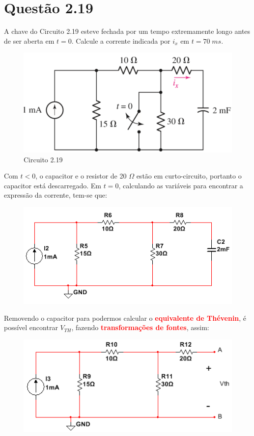 \documentclass[
	12pt,				%
	oneside,			%
	a4paper,			%
	english,			%
	french,				%
	spanish,			%
	brazil				%
	]{abntex2}
\begin{document}
\section*{Questão 2.19}
A chave do Circuito 2.19 esteve fechada por um tempo extremamente longo antes de ser aberta em $t=0$. Calcule a corrente indicada por $i_x$ em $t=70\;ms$.

\begin{figure}[htb]
	\centering
	\includegraphics[scale=0.5]{2-19.PNG}
	\caption{Circuito 2.19}
\end{figure}

Com $t<0$, o capacitor e o resistor de 20 $\Omega$ estão em curto-circuito, portanto o capacitor está descarregado. Em $t=0$, calculando as variáveis para encontrar a expressão da corrente, tem-se que:

\begin{figure}[htb]
	\centering
	\includegraphics[scale=0.75]{Circuito_2-19(a).PNG}
\end{figure}

Removendo o capacitor para podermos calcular o \textbf{\textcolor{red}{equivalente de Thévenin}}, é possível encontrar $V_{TH}$, fazendo \textbf{\textcolor{red}{transformações de fontes}}, assim:
\begin{figure}[htb]
	\centering
	\includegraphics[scale=0.75]{Circuito_2-19(c).PNG}
\end{figure}
\end{document}
